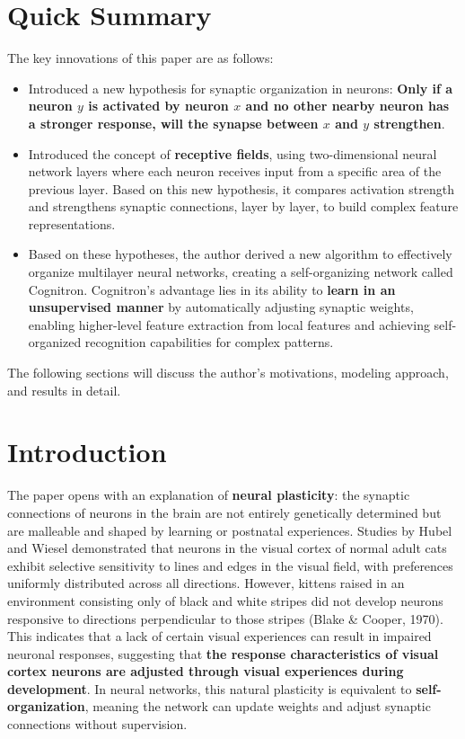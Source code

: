 \documentclass[11p,oneside]{book}
\begin{document}
\section*{Quick Summary}

The key innovations of this paper are as follows:
\begin{itemize}
    \item Introduced a new hypothesis for synaptic organization in neurons: \textbf{Only if a neuron $y$ is activated by neuron $x$ and no other nearby neuron has a stronger response, will the synapse between $x$ and $y$ strengthen}.
    \item Introduced the concept of \textbf{receptive fields}, using two-dimensional neural network layers where each neuron receives input from a specific area of the previous layer. Based on this new hypothesis, it compares activation strength and strengthens synaptic connections, layer by layer, to build complex feature representations.
    \item Based on these hypotheses, the author derived a new algorithm to effectively organize multilayer neural networks, creating a self-organizing network called Cognitron. Cognitron’s advantage lies in its ability to \textbf{learn in an unsupervised manner} by automatically adjusting synaptic weights, enabling higher-level feature extraction from local features and achieving self-organized recognition capabilities for complex patterns.
\end{itemize}

The following sections will discuss the author's motivations, modeling approach, and results in detail.

\section*{Introduction}

The paper opens with an explanation of \textbf{neural plasticity}: the synaptic connections of neurons in the brain are not entirely genetically determined but are malleable and shaped by learning or postnatal experiences. Studies by Hubel and Wiesel demonstrated that neurons in the visual cortex of normal adult cats exhibit selective sensitivity to lines and edges in the visual field, with preferences uniformly distributed across all directions. However, kittens raised in an environment consisting only of black and white stripes did not develop neurons responsive to directions perpendicular to those stripes (Blake \& Cooper, 1970). This indicates that a lack of certain visual experiences can result in impaired neuronal responses, suggesting that \textbf{the response characteristics of visual cortex neurons are adjusted through visual experiences during development}. In neural networks, this natural plasticity is equivalent to \textbf{self-organization}, meaning the network can update weights and adjust synaptic connections without supervision.
\\
\end{document}
